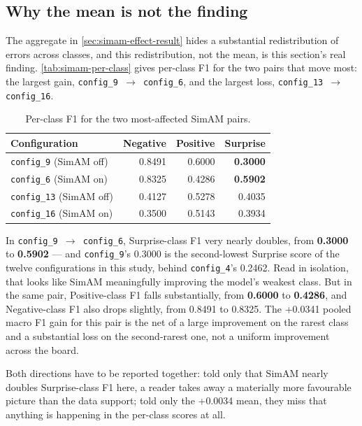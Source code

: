 \subsection{Why the mean is not the finding}
\label{sec:simam-mean-not-finding}

The aggregate in \autoref{sec:simam-effect-result} hides a substantial redistribution of errors across classes, and this redistribution, not the mean, is this section's real finding. \autoref{tab:simam-per-class} gives per-class F1 for the two pairs that move most: the largest gain, \texttt{config\_9 $\rightarrow$ config\_6}, and the largest loss, \texttt{config\_13 $\rightarrow$ config\_16}.

\begin{table}[htbp]
	\centering
	\begin{tabular}{l r r r}
		\hline
		\textbf{Configuration} & \textbf{Negative} & \textbf{Positive} & \textbf{Surprise} \\
		\hline
		\texttt{config\_9} (SimAM off)  & 0.8491 & 0.6000 & \textbf{0.3000} \\
		\texttt{config\_6} (SimAM on)   & 0.8325 & 0.4286 & \textbf{0.5902} \\
		\texttt{config\_13} (SimAM off) & 0.4127 & 0.5278 & 0.4035 \\
		\texttt{config\_16} (SimAM on)  & 0.3500 & 0.5143 & 0.3934 \\
		\hline
	\end{tabular}
	\caption[Per-class F1 for the two most-affected SimAM pairs]{Per-class F1 for the two most-affected SimAM pairs.}
	\label{tab:simam-per-class}
\end{table}

In \texttt{config\_9 $\rightarrow$ config\_6}, Surprise-class F1 very nearly doubles, from \textbf{0.3000} to \textbf{0.5902} --- and \texttt{config\_9}'s 0.3000 is the second-lowest Surprise score of the twelve configurations in this study, behind \texttt{config\_4}'s 0.2462. Read in isolation, that looks like SimAM meaningfully improving the model's weakest class. But in the same pair, Positive-class F1 falls substantially, from \textbf{0.6000} to \textbf{0.4286}, and Negative-class F1 also drops slightly, from 0.8491 to 0.8325. The +0.0341 pooled macro F1 gain for this pair is the net of a large improvement on the rarest class and a substantial loss on the second-rarest one, not a uniform improvement across the board.

Both directions have to be reported together: told only that SimAM nearly doubles Surprise-class F1 here, a reader takes away a materially more favourable picture than the data support; told only the +0.0034 mean, they miss that anything is happening in the per-class scores at all.

